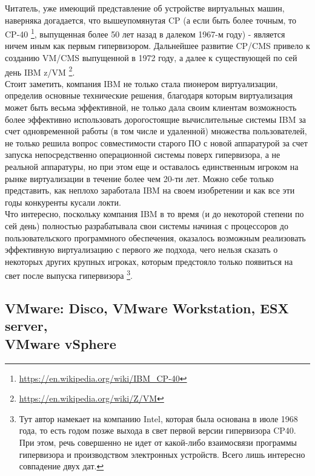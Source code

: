 \documentclass[14pt, a4paper]{article}
\begin{document}
Читатель, уже имеющий представление об устройстве виртуальных машин, наверняка
догадается, что вышеупомянутая CP (а если быть более точным, то CP-40 \footnote{\href{https://en.wikipedia.org/wiki/IBM_CP-40}{https://en.wikipedia.org/wiki/IBM\_CP-40}},
выпущенная более 50 лет назад в далеком 1967-м году) - является ничем иным как
первым гипервизором. Дальнейшее развитие CP/CMS привело к созданию VM/CMS
выпущенной в 1972 году, а далее к существующей по сей день IBM z/VM \footnote{\href{https://en.wikipedia.org/wiki/Z/VM}{https://en.wikipedia.org/wiki/Z/VM}}.\\

Стоит заметить, компания IBM не только стала пионером виртуализации, определив
основные технические решения, благодаря которым виртуализация может быть весьма
эффективной, не только дала своим клиентам возможность более эффективно
использовать дорогостоящие вычислительные системы IBM за счет одновременной
работы (в том числе и удаленной) множества пользователей, не только решила вопрос
совместимости старого ПО с новой аппаратурой за счет запуска непосредственно
операционной системы поверх гипервизора, а не реальной аппаратуры, но при этом
еще и оставалось единственным игроком на рынке виртуализации в течение более
чем 20-ти лет. Можно себе только представить, как неплохо заработала IBM на своем
изобретении и как все эти годы конкуренты кусали локти.\\

Что интересно, поскольку компания IBM в то время (и до некоторой степени по сей
день) полностью разрабатывала свои системы начиная с процессоров до
пользовательского программного обеспечения, оказалось возможным реализовать
эффективную виртуализацию с первого же подхода, чего нельзя сказать о некоторых 
других крупных игроках, которым предстояло только появиться на свет после выпуска
гипервизора \footnote{Тут автор намекает на компанию Intel, которая была основана в июле 1968 года, то есть годом
позже выхода в свет первой версии гипервизора CP40. При этом, речь совершенно не идет от
какой-либо взаимосвязи программы гипервизора и производством электронных устройств.
Всего лишь интересно совпадение двух дат.}.

\subsection*{VMware: Disco, VMware Workstation, ESX server, \\
VMware vSphere}
\end{document}
